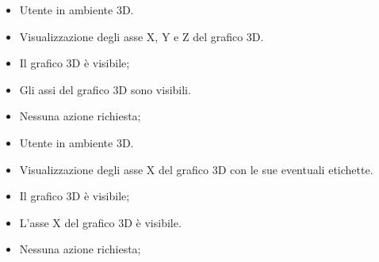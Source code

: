 \UCdsc
    { %
        \begin{itemize}
            \item Utente in ambiente 3D.
        \end{itemize}
    }
    { %
        \begin{itemize}
            \item Visualizzazione degli asse X, Y e Z del grafico 3D.
        \end{itemize}
    }
    { %
        \begin{itemize}
            \item Il grafico 3D è visibile;
        \end{itemize}
    }
    { %
        \begin{itemize}
            \item Gli assi del grafico 3D sono visibili.
        \end{itemize}
    }
    { %
        \begin{itemize}
            \item Nessuna azione richiesta;
        \end{itemize}
    }

\UCdsc
    { %
        \begin{itemize}
            \item Utente in ambiente 3D.
        \end{itemize}
    }
    { %
        \begin{itemize}
            \item Visualizzazione degli asse X del grafico 3D con le sue eventuali etichette.
        \end{itemize}
    }
    { %
        \begin{itemize}
            \item Il grafico 3D è visibile;
        \end{itemize}
    }
    { %
        \begin{itemize}
            \item L'asse X del grafico 3D è visibile.
        \end{itemize}
    }
    { %
        \begin{itemize}
            \item Nessuna azione richiesta;
        \end{itemize}
    }

